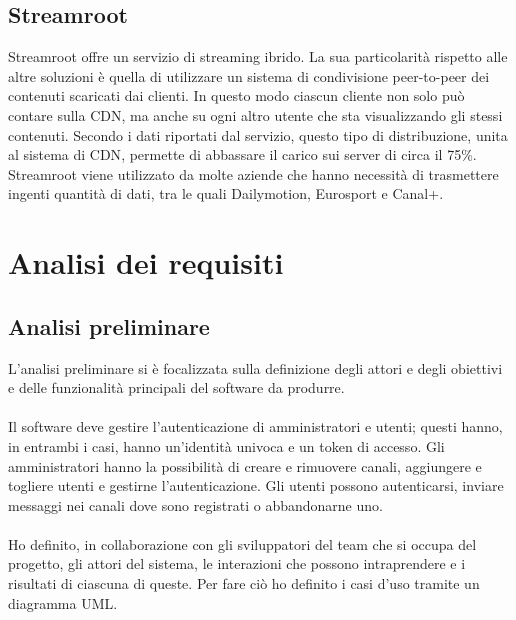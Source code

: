 		\subsection{Streamroot}
		Streamroot offre un servizio di streaming ibrido. La sua particolarità rispetto alle altre soluzioni è quella di utilizzare un sistema di condivisione peer-to-peer dei contenuti scaricati dai clienti. In questo modo ciascun cliente non solo può contare sulla \gls{CDN}, ma anche su ogni altro utente che sta visualizzando gli stessi contenuti. Secondo i dati riportati dal servizio, questo tipo di distribuzione, unita al sistema di \gls{CDN}, permette di abbassare il carico sui server di circa il 75\%. Streamroot viene utilizzato da molte aziende che hanno necessità di trasmettere ingenti quantità di dati, tra le quali Dailymotion, Eurosport e Canal+.
	

\section{Analisi dei requisiti}
	\subsection{Analisi preliminare}
		L'analisi preliminare si è focalizzata sulla definizione degli attori e degli obiettivi e delle funzionalità principali del software da produrre.
		\paragraph*{}
		Il software deve gestire l'autenticazione di amministratori e utenti; questi hanno, in entrambi i casi, hanno un'identità univoca e un token di accesso. Gli amministratori hanno la possibilità di creare e rimuovere canali, aggiungere e togliere utenti e gestirne l'autenticazione.
		Gli utenti possono autenticarsi, inviare messaggi nei canali dove sono registrati o abbandonarne uno.
		\paragraph*{}
		Ho definito, in collaborazione con gli sviluppatori del team che si occupa del progetto, gli attori del sistema, le interazioni che possono intraprendere e i risultati di ciascuna di queste. Per fare ciò ho definito i casi d'uso tramite un diagramma \gls{UML}.\@

